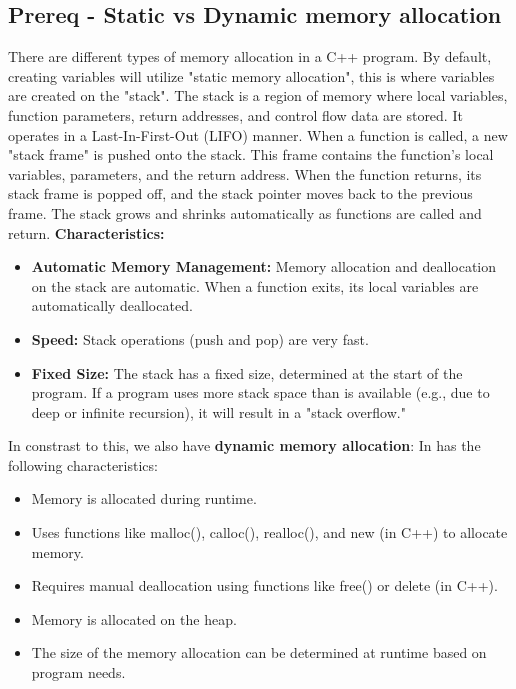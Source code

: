 \documentclass{report}
\begin{document}
    \subsection{Prereq - Static vs Dynamic memory allocation}
    \bigbreak \noindent 
    There are different types of memory allocation in a C++ program. By default, creating variables will utilize "static memory allocation", this is where variables are created on the "stack". The stack is a region of memory where local variables, function parameters, return addresses, and control flow data are stored. It operates in a Last-In-First-Out (LIFO) manner.
    \bigbreak \noindent 
    When a function is called, a new "stack frame" is pushed onto the stack. This frame contains the function's local variables, parameters, and the return address.
    When the function returns, its stack frame is popped off, and the stack pointer moves back to the previous frame.
    The stack grows and shrinks automatically as functions are called and return.
    \bigbreak \noindent 
    \textbf{Characteristics:}
    \begin{itemize}
        \item \textbf{Automatic Memory Management:} Memory allocation and deallocation on the stack are automatic. When a function exits, its local variables are automatically deallocated.
        \item \textbf{Speed:} Stack operations (push and pop) are very fast.
        \item \textbf{Fixed Size:} The stack has a fixed size, determined at the start of the program. If a program uses more stack space than is available (e.g., due to deep or infinite recursion), it will result in a "stack overflow."
    \end{itemize}
    \bigbreak \noindent 
    In constrast to this, we also have \textbf{dynamic memory allocation}: In has the following characteristics:
    \begin{itemize}
        \item Memory is allocated during runtime.
        \item Uses functions like malloc(), calloc(), realloc(), and new (in C++) to allocate memory.
        \item Requires manual deallocation using functions like free() or delete (in C++).
        \item Memory is allocated on the heap.
        \item The size of the memory allocation can be determined at runtime based on program needs.
    \end{itemize}
\end{document}
